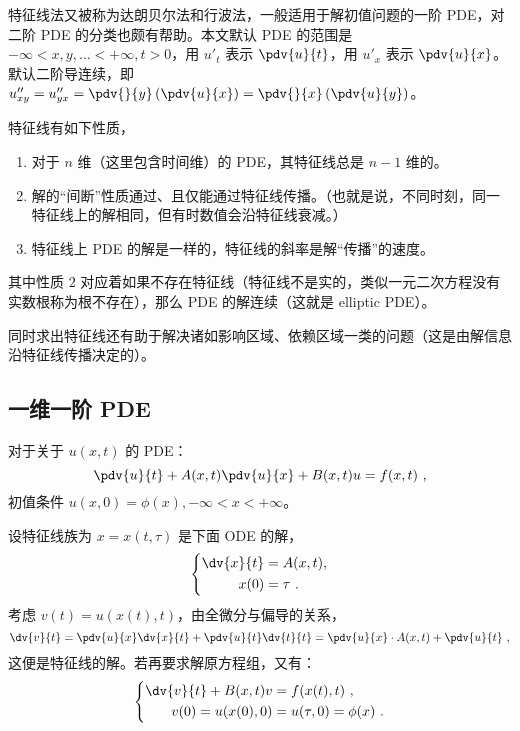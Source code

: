 

特征线法又被称为达朗贝尔法和行波法，一般适用于解初值问题的一阶 PDE，对二阶 PDE 的分类也颇有帮助。本文默认 PDE 的范围是 $-\infty < x, y, \dots < +\infty, t>0$，用 $u'_t$ 表示 $\pdv{u}{t}$，用 $u'_x$ 表示 $\pdv{u}{x}$。默认二阶导连续，即 $u''_{xy} = u''_{yx} = \pdv{}{y}\left(\pdv{u}{x}\right) = \pdv{}{x}\left(\pdv{u}{y}\right)$。

特征线有如下性质，
\begin{enumerate}
\item 对于 $n$ 维（这里包含时间维）的 PDE，其特征线总是 $n-1$ 维的。
\item 解的“间断”性质通过、且仅能通过特征线传播。（也就是说，不同时刻，同一特征线上的解相同，但有时数值会沿特征线衰减。）
\item 特征线上 PDE 的解是一样的，特征线的斜率是解“传播”的速度。
\end{enumerate}
其中性质 $2$ 对应着如果不存在特征线（特征线不是实的，类似一元二次方程没有实数根称为根不存在），那么 PDE 的解连续（这就是 elliptic PDE）。

同时求出特征线还有助于解决诸如影响区域、依赖区域一类的问题（这是由解信息沿特征线传播决定的）。






\subsection{一维一阶 PDE}
\begin{theorem}{}
对于关于 $u(x, t)$ 的 PDE：
\begin{equation}
\pdv{u}{t} + A(x, t) \pdv{u}{x} + B(x, t) u = f(x, t) ~,
\end{equation}
初值条件 $u(x, 0) = \phi(x), -\infty < x < +\infty$。

设特征线族为 $x = x(t, \tau)$ 是下面 ODE 的解，
\begin{equation}
\left\{
\begin{aligned}
\dv{x}{t} &= A(x, t), \\
x(0) &= \tau ~.
\end{aligned}
\right .
\end{equation}
考虑 $v(t) = u(x(t), t)$，由全微分与偏导的关系，
$$\dv{v}{t} = \pdv{u}{x} \dv{x}{t} + \pdv{u}{t} \dv{t}{t} = \pdv{u}{x} \cdot A(x, t) + \pdv{u}{t} ~,$$
这便是特征线的解。若再要求解原方程组，又有：
\begin{equation}
\left\{
\begin{aligned}
\dv{v}{t} + B(x, t) v &= f(x(t), t) ~, \\
v(0) = u(x(0), 0) &= u(\tau, 0) = \phi(x) ~.
\end{aligned}
\right.
\end{equation}
\end{theorem}











